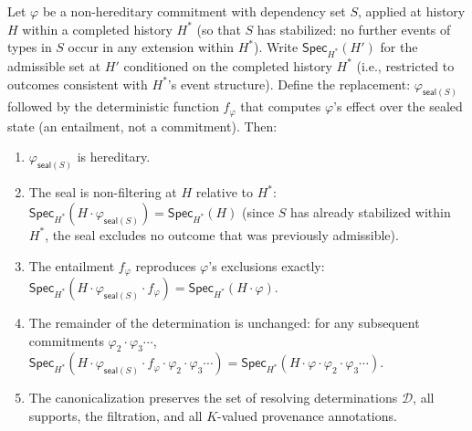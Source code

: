 \documentclass[acmsmall,review,anonymous]{acmart}
\newcommand{\Spec}{\mathsf{Spec}}
\newcommand{\seal}{\mathsf{seal}}
\theoremstyle{remark}
\numberwithin{definition}{section}
\numberwithin{theorem}{section}
\numberwithin{lemma}{section}
\numberwithin{corollary}{section}
\numberwithin{remark}{section}
\numberwithin{example}{section}
\numberwithin{observation}{section}
\numberwithin{assumption}{section}
\begin{document}
\begin{proposition}
  \label{prop:persistence-canon}
  Let $\varphi$ be a non-hereditary commitment with dependency set $S$,
  applied at history $H$ within a completed history $H^*$ (so that $S$
  has stabilized: no further events of types in $S$ occur in any
  extension within $H^*$).
  Write $\Spec_{H^*}(H')$ for the admissible set at $H'$ conditioned
  on the completed history $H^*$ (i.e., restricted to outcomes
  consistent with $H^*$'s event structure).
  Define the replacement: $\varphi_{\seal(S)}$ followed by the
  deterministic function $f_\varphi$ that computes $\varphi$'s effect
  over the sealed state (an entailment, not a commitment).
  Then:
  \begin{enumerate}[nosep,label=(\alph*)]
    \item $\varphi_{\seal(S)}$ is hereditary.
    \item The seal is non-filtering at $H$ relative to $H^*$:
          $\Spec_{H^*}(H \cdot \varphi_{\seal(S)}) = \Spec_{H^*}(H)$
          (since $S$ has already stabilized within $H^*$, the seal
          excludes no outcome that was previously admissible).
    \item The entailment $f_\varphi$ reproduces $\varphi$'s exclusions
          exactly: $\Spec_{H^*}(H \cdot \varphi_{\seal(S)} \cdot f_\varphi)
          = \Spec_{H^*}(H \cdot \varphi)$.
    \item The remainder of the determination is unchanged: for any
          subsequent commitments $\varphi_2 \cdot \varphi_3 \cdots$,
          $\Spec_{H^*}(H \cdot \varphi_{\seal(S)} \cdot f_\varphi \cdot
          \varphi_2 \cdot \varphi_3 \cdots)
          = \Spec_{H^*}(H \cdot \varphi \cdot \varphi_2 \cdot \varphi_3 \cdots)$.
    \item The canonicalization preserves the set of resolving
          determinations $\mathcal{D}$, all supports, the filtration,
          and all $K$-valued provenance annotations.
  \end{enumerate}
\end{proposition}
\end{document}
